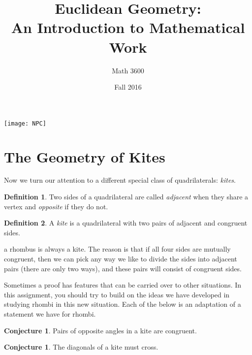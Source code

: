 \documentclass{tufte-handout}
\title{Euclidean Geometry:\\An Introduction to Mathematical Work}
\author[]{Math 3600}
\date{Fall 2016}
\theoremstyle{definition}
\newtheorem{conjecture}[problem]{Conjecture}
\newtheorem*{definition}{Definition}
\begin{document}
\maketitle

\begin{marginfigure}
    \texttt{[image: NPC]}
\end{marginfigure}

\setcounter{section}{2}
\section{The Geometry of Kites}

Now we turn our attention to a different special class of quadrilaterals: \emph{kites}.

\begin{definition}\label{defn:quad-sides-type}
Two sides of a quadrilateral are called \emph{adjacent} when they share a vertex and \emph{opposite} if they do not.
\end{definition}


\begin{definition}\label{defn:kite}
A \emph{kite} is a quadrilateral with two pairs of adjacent and congruent sides.
\end{definition}

 a rhombus is always a kite.
The reason is that if all four sides are mutually congruent, then we can pick any way we like to divide the sides into adjacent pairs (there are only two ways), and these pairs will consist of congruent sides.

Sometimes a proof has features that can be carried over to other situations.
In this assignment, you should try to build on the ideas we have developed in studying rhombi in this new situation.
Each of the below is an adaptation of a statement we have for rhombi.

\begin{conjecture}\label{conj:kite-opp-angles}
Pairs of opposite angles in a kite are congruent.
\end{conjecture}

\begin{conjecture}\label{conj:kite-diagonals-cross}
The diagonals of a kite must cross.
\end{conjecture}
\end{document}
